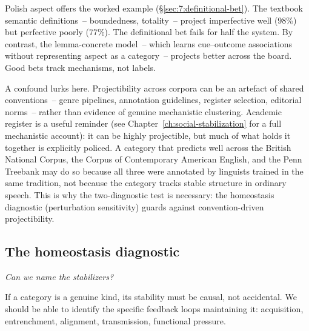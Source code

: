 Polish aspect offers the worked example (§\ref{sec:7:definitional-bet}). The textbook semantic definitions~-- boundedness, totality~-- project imperfective well (98\%) but perfective poorly (77\%). The definitional bet fails for half the system. By contrast, the lemma-concrete model~-- which learns cue--outcome associations without representing aspect as a category~-- projects better across the board. Good bets track mechanisms, not labels.

	A confound lurks here. Projectibility across corpora can be an artefact of shared conventions~-- genre pipelines, annotation guidelines, register selection, editorial norms~-- rather than evidence of genuine mechanistic clustering. Academic register is a useful reminder (see Chapter~\ref{ch:social-stabilization} for a full mechanistic account): it can be highly projectible, but much of what holds it together is explicitly policed. A category that predicts well across the British National Corpus, the Corpus of Contemporary American English, and the Penn Treebank may do so because all three were annotated by linguists trained in the same tradition, not because the category tracks stable structure in ordinary speech. This is why the two-diagnostic test is necessary: the homeostasis diagnostic (perturbation sensitivity) guards against convention-driven projectibility.

\subsection{The homeostasis diagnostic}
\label{sec:8:homeostasis-diagnostic}

\emph{Can we name the stabilizers?}

If a category is a genuine kind, its stability must be causal, not accidental. We should be able to identify the specific feedback loops maintaining it: acquisition, entrenchment, alignment, transmission, functional pressure.

